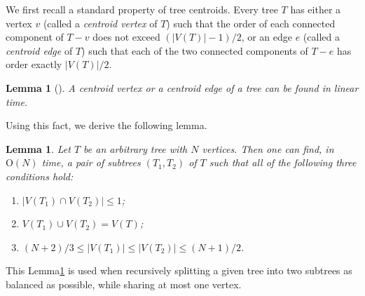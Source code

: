 \documentclass[letter,11pt]{article}
\newtheorem{la}[thm]{Lemma}
\theoremstyle{definition}
\theoremstyle{definition}
\newcommand{\1}{\boldmath$~1~$\unboldmath}
\newcommand{\Ord}{\mathrm{O}}
\newcommand{\tume}{\hspace*{0.2em}}
\begin{document}
We first recall a standard property of tree centroids.
Every tree $T$ has either a vertex $v$ (called a {\it centroid vertex} of $T$)
such that the order of each connected component of $T-v$ does not exceed $(|V(T)|-1)/2$,
or an edge $e$ (called a {\it centroid edge} of $T$) such that each of the two connected
components of $T-e$ has order exactly $|V(T)|/2$.
\begin{la}[\hspace{-0.3pt}\cite{MR396308}]\label{centroid}
A centroid vertex or a centroid edge of a tree can be found in linear time.
\end{la}
Using this fact, we derive the following lemma.
\begin{la}\label{centroid-splitting}
Let $T$ be an arbitrary tree with $N$ vertices. 
Then one can find, in $\Ord(N)$ time, a pair of subtrees $(T_1, T_2)$ of $T$ such that all of 
the following three conditions hold:
\begin{enumerate}
    \item $|V(T_1)\cap V(T_2)| \leq 1$;
    \item $V(T_1) \cup V(T_2) = V(T)$;
    \item $(N+2)/3 \leq |V(T_1)| \leq |V(T_2)| \leq (N+1)/2$.
\end{enumerate}
\end{la}
This Lemma\tume\ref{centroid-splitting} is used when recursively splitting a given tree 
into two subtrees as balanced as possible, while sharing at most one vertex.

\end{document}
